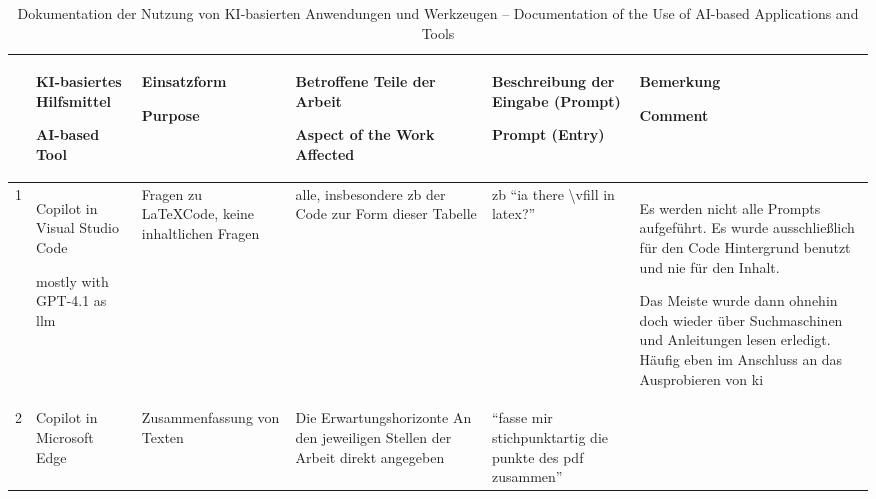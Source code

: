         \begin{landscape}
    \begin{table}
\centering 
\begin{tabularx}{\linewidth}{| X | X | X | X | X | X |} %

    \hline
     & 
    KI-basiertes Hilfsmittel 
        
    AI-based Tool & 
    Einsatzform 

    Purpose & 
    Betroffene Teile der Arbeit 
        
    Aspect of the Work Affected & 
    Beschreibung der Eingabe (Prompt) 
  
    Prompt (Entry) & 
    Bemerkung 
    
    Comment\\
    \hline
    \hline
    
    1 & 
    Copilot in Visual Studio Code
    
    mostly with GPT-4.1 as \gls{llm} & 
    Fragen zu \LaTeX Code, keine inhaltlichen Fragen &
    alle, insbesondere \gls{zb} der Code zur Form dieser Tabelle & 
    \gls{zb} \enquote{ia there \textbackslash{}vfill in latex?} & 
    Es werden nicht alle Prompts aufgeführt. Es wurde ausschließlich für den Code Hintergrund benutzt und nie für den Inhalt. 
    
    Das Meiste wurde dann ohnehin doch wieder über Suchmaschinen und Anleitungen lesen erledigt. Häufig eben im Anschluss an das Ausprobieren von \gls{ki} \\
    \hline


     2 & 
    Copilot in Microsoft Edge & 
    Zusammenfassung von Texten & 
    Die Erwartungshorizonte       
    An den jeweiligen Stellen der Arbeit direkt angegeben &
    \enquote{fasse mir stichpunktartig die punkte des pdf zusammen} & 
    \\

\end{tabularx}

\caption{Dokumentation der Nutzung von KI-basierten Anwendungen und Werkzeugen -- Documentation of the Use of AI-based Applications and Tools}

\label{KIHilfsmittel}

    \end{table}

        \end{landscape}




